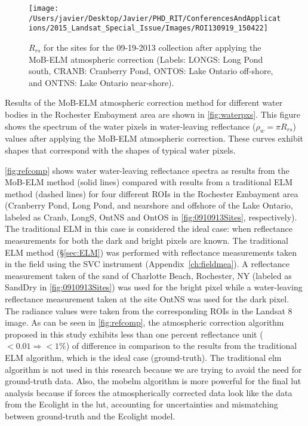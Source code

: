 \begin{figure}[htbp!]
  \centering
  \texttt{[image: /Users/javier/Desktop/Javier/PHD\_RIT/ConferencesAndApplications/2015\_Landsat\_Special\_Issue/Images/ROI130919\_150422]}

  \caption[$R_{rs}$ for the sites for the 09-19-2013 collection after applying the MoB-ELM atmospheric correction.]{$R_{rs}$ for the sites for the 09-19-2013 collection after applying the MoB-ELM atmospheric correction (Labels: LONGS: Long Pond south, CRANB: Cranberry Pond, ONTOS: Lake Ontario off-shore, and ONTNS: Lake Ontario near-shore). \label{fig:RrsROIs_130919}} 
\end{figure}

Results of the MoB-ELM atmospheric correction method for different water bodies in the Rochester Embayment area are shown in \autoref{fig:waterpxs}. This figure shows the spectrum of the water pixels in water-leaving reflectance ($\rho_w=\pi R_{rs}$) values after applying the MoB-ELM atmospheric correction. These curves exhibit shapes that correspond with the shapes of typical water pixels. 

\autoref{fig:refcomp} shows water water-leaving reflectance spectra as results from the MoB-ELM method (solid lines) compared with results from a traditional ELM method (dashed lines) for four different ROIs in the Rochester Embayment area (Cranberry Pond, Long Pond, and nearshore and offshore of the Lake Ontario, labeled as Cranb, LongS, OntNS and OntOS in \autoref{fig:0910913Sites}, respectively). The traditional ELM in this case is considered the ideal case: when reflectance measurements for both the dark and bright pixels are known. The traditional ELM method (\S\ref{sec:ELM}) was performed with reflectance measurements taken in the field using the SVC instrument \cite{SVCHR1024i} (Appendix~\ref{ch:fieldmea}). A reflectance measurement taken of the sand of Charlotte Beach, Rochester, NY (labeled as SandDry in \autoref{fig:0910913Sites}) was used for the bright pixel while a water-leaving reflectance measurement taken at the site OntNS was used for the dark pixel. The radiance values were taken from the corresponding ROIs in the Landsat 8 image. As can be seen in \autoref{fig:refcomp}, the atmospheric correction algorithm proposed in this study exhibits less than one percent reflectance unit ($<0.01\Rightarrow <1\%$) of difference in comparison to the results from the traditional ELM algorithm, which is the ideal case (ground-truth). The traditional \gls{elm} algorithm is not used in this research because we are trying to avoid the need for ground-truth data. Also, the \gls{mobelm} algorithm is more powerful for the final \gls{lut} analysis because if forces the atmospherically corrected data look like the data from the Ecolight in the \gls{lut}, accounting for uncertainties and mismatching between ground-truth and the Ecolight model.

